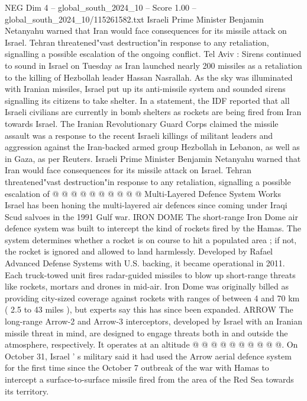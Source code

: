 \begin{textsample}{NEG Dim 4 – global\_south\_2024\_10 – Score 1.00 – global\_south\_2024\_10/115261582.txt}  \label{ex:f4_neg_079}
Israeli Prime Minister Benjamin Netanyahu warned that Iran would face consequences for its missile attack on Israel.
Tehran threatened"vast destruction"in response to any retaliation, signalling a possible escalation of the ongoing conflict.
Tel Aviv : Sirens continued to sound in Israel on Tuesday as Iran launched nearly 200 missiles as a retaliation to the killing of Hezbollah leader Hassan Nasrallah.
As the sky was illuminated with Iranian missiles, Israel put up its anti-missile system and sounded sirens signalling its citizens to take shelter.
In a statement, the IDF reported that all Israeli civilians are currently in bomb shelters as rockets are being fired from Iran towards Israel.
The Iranian Revolutionary Guard Corps claimed the missile assault was a response to the recent Israeli killings of militant leaders and aggression against the Iran-backed armed group Hezbollah in Lebanon, as well as in Gaza, as per Reuters.
Israeli Prime Minister Benjamin Netanyahu warned that Iran would face consequences for its missile attack on Israel.
Tehran threatened"vast destruction"in response to any retaliation, signalling a possible escalation of @ @ @ @ @ @ @ @ @ @ Multi-Layered Defence System Works Israel has been honing the multi-layered air defences since coming under Iraqi Scud salvoes in the 1991 Gulf war.
IRON DOME The short-range Iron Dome air defence system was built to intercept the kind of rockets fired by the Hamas.
The system determines whether a rocket is on course to hit a populated area ; if not, the rocket is ignored and allowed to land harmlessly.
Developed by Rafael Advanced Defense Systems with U.S. backing, it became operational in 2011.
Each truck-towed unit fires radar-guided missiles to blow up short-range threats like rockets, mortars and drones in mid-air.
Iron Dome was originally billed as providing city-sized coverage against rockets with ranges of between 4 and 70 km ( 2.5 to 43 miles ), but experts say this has since been expanded.
ARROW The long-range Arrow-2 and Arrow-3 interceptors, developed by Israel with an Iranian missile threat in mind, are designed to engage threats both in and outside the atmosphere, respectively.
It operates at an altitude @ @ @ @ @ @ @ @ @ @.
On October 31, Israel ' s military said it had used the Arrow aerial defence system for the first time since the October 7 outbreak of the war with Hamas to intercept a surface-to-surface missile fired from the area of the Red Sea towards its territory.

\end{textsample}
